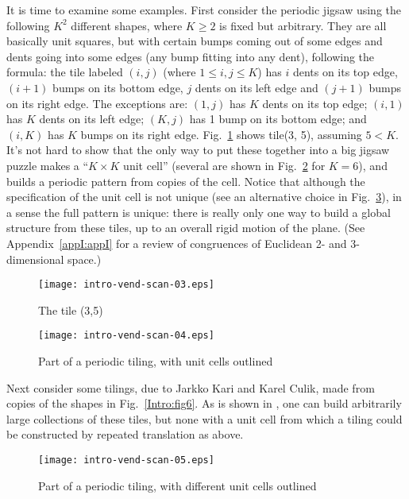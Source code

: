 \documentclass[reqno]{stml-l}
\theoremstyle{plain}
\theoremstyle{definition}
\numberwithin{equation}{chapter}
\begin{document}
It is time to examine some examples. First consider the
periodic jigsaw using the following $K^{2}$ different
shapes, where $K\geq 2$ is fixed but arbitrary. They are
all basically unit squares, but with certain bumps coming
out of some edges and dents going into some edges (any bump
fitting into any dent), following the formula: the tile
labeled $(i,j)$ (where $1\leq i,j\leq K$) has $i$ dents on
its top edge, $(i+1)$ bumps on its bottom edge, $j$ dents
on its left edge and $(j+1)$ bumps on its right edge. The
exceptions are: $(1, j)$ has $K$ dents on its top edge;
$(i, 1)$ has $K$ dents on its left edge; $(K,j)$ has 1 bump
on its bottom edge; and $(i, K)$ has $K$ bumps on its right
edge. Fig.~\ref{Intro:fig3} shows tile(3, 5), assuming
$5<K$. It's not hard to show that the only way to put these
together into a big jigsaw puzzle makes a ``$K\times K$
unit cell'' (several are shown in Fig.~\ref{Intro:fig4} for
$K=6$), and builds a periodic pattern from copies of the
cell. Notice that although the specification of the unit
cell is not unique (see an alternative choice in
Fig.~\ref{Intro:fig5}), in a sense the full pattern is
unique: there is really only one way to build a global
structure from these tiles, up to an overall rigid motion
of the plane. (See Appendix~\ref{appI:appI} for a review of
congruences of Euclidean 2- and 3-dimensional space.)
\begin{figure}[h]
\texttt{[image: intro-vend-scan-03.eps]}
\caption{The tile (3,5)}
\label{Intro:fig3}
\end{figure}

\begin{figure}[h]
\texttt{[image: intro-vend-scan-04.eps]}
\caption{Part of a periodic tiling, with unit cells outlined}
\label{Intro:fig4}
\end{figure}


Next consider some tilings, due to Jarkko Kari and Karel
Culik, made from copies
of the shapes in Fig.~\ref{Intro:fig6}. As is shown in
\cite{bib:Cul}, one can build arbitrarily large collections
of these tiles, but none with a unit cell from which a
tiling could be constructed by repeated translation as
above.
\begin{figure}[h]
\texttt{[image: intro-vend-scan-05.eps]}
\caption{Part of a periodic tiling, with different unit cells
outlined}
\label{Intro:fig5}
\end{figure}
\end{document}
